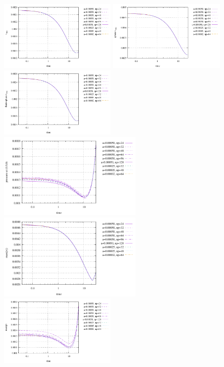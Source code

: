 \begin{center}
\includegraphics[width=5.7cm]{python_codes/fieldstone_93/results/vrms}
\includegraphics[width=5.7cm]{python_codes/fieldstone_93/results/vrms_sphere}
\includegraphics[width=5.7cm]{python_codes/fieldstone_93/results/vrms_fluidsphere}\\
\includegraphics[width=7cm]{python_codes/fieldstone_93/results/p_bottom}
\includegraphics[width=7cm]{python_codes/fieldstone_93/results/max_vel}\\
\includegraphics[width=5.7cm]{python_codes/fieldstone_93/results/max_press}

\end{center}
